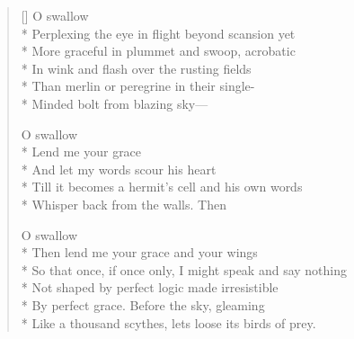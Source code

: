 \label{ch:lear_af}
\settowidth{\versewidth}{So that once, if once only, I might speak and say nothing}
\begin{verse}[\versewidth]
O swallow\\*
Perplexing the eye in flight beyond scansion yet\\*
More graceful in plummet and swoop, acrobatic\\*
In wink and flash over the rusting fields\\*
Than merlin or peregrine in their single-\\*
Minded bolt from blazing sky---

O swallow\\*
Lend me your grace\\*
And let my words scour his heart\\*
Till it becomes a hermit's cell and his own words\\*
Whisper back from the walls. Then

O swallow\\*
Then lend me your grace and your wings\\*
So that once, if once only, I might speak and say nothing\\*
Not shaped by perfect logic made irresistible\\*
By perfect grace. Before the sky, gleaming\\*
Like a thousand scythes, lets loose its birds of prey.
\end{verse}
